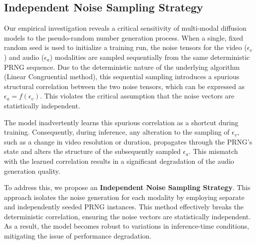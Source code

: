 \subsection{Independent Noise Sampling Strategy}

Our empirical investigation reveals a critical sensitivity of multi-modal diffusion models to the pseudo-random number generation process. When a single, fixed random seed is used to initialize a training run, the noise tensors for the video (${\epsilon}_v$) and audio (${\epsilon}_a$) modalities are sampled sequentially from the same deterministic PRNG sequence. Due to the deterministic nature of the underlying algorithm (Linear Congruential method), this sequential sampling introduces a spurious structural correlation between the two noise tensors, which can be expressed as ${\epsilon}_a = f({\epsilon}_v)$. This violates the critical assumption that the noise vectors are statistically independent.

The model inadvertently learns this spurious correlation as a shortcut during training. Consequently, during inference, any alteration to the sampling of ${\epsilon}_v$, such as a change in video resolution or duration, propagates through the PRNG's state and alters the structure of the subsequently sampled ${\epsilon}_a$. This mismatch with the learned correlation results in a significant degradation of the audio generation quality.

To address this, we propose an \textbf{Independent Noise Sampling Strategy}. This approach isolates the noise generation for each modality by employing separate and independently seeded PRNG instances. This method effectively breaks the deterministic correlation, ensuring the noise vectors are statistically independent. As a result, the model becomes robust to variations in inference-time conditions, mitigating the issue of performance degradation.

